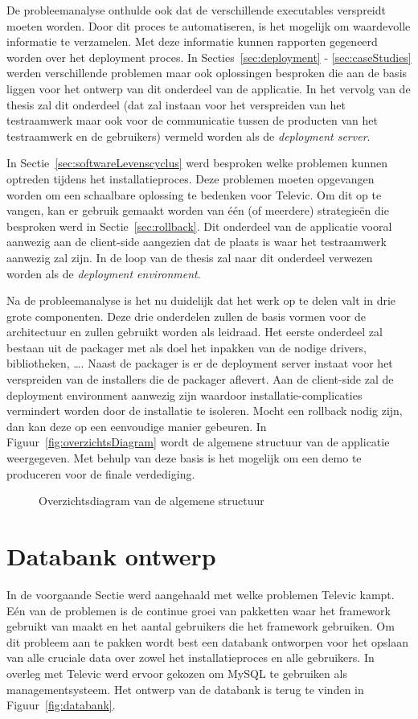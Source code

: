 De probleemanalyse onthulde ook dat de verschillende executables verspreidt moeten worden.
Door dit proces te automatiseren, is het mogelijk om waardevolle informatie te verzamelen.
Met deze informatie kunnen rapporten gegeneerd worden over het deployment proces.
In Secties~\ref{sec:deployment} - \ref{sec:caseStudies} werden verschillende problemen maar ook oplossingen besproken die aan de basis liggen voor het ontwerp van dit onderdeel van de applicatie. 
In het vervolg van de thesis zal dit onderdeel (dat zal instaan voor het verspreiden van het testraamwerk maar ook voor de communicatie tussen de producten van het testraamwerk en de gebruikers) vermeld worden als de \emph{deployment server}.

In Sectie~\vref{sec:softwareLevenscyclus} werd besproken welke problemen kunnen optreden tijdens het installatieproces.
Deze problemen moeten opgevangen worden om een schaalbare oplossing te bedenken voor Televic.
Om dit op te vangen, kan er gebruik gemaakt worden van één (of meerdere) strategieën die besproken werd in Sectie~\vref{sec:rollback}.
Dit onderdeel van de applicatie vooral aanwezig aan de client-side aangezien dat de plaats is waar het testraamwerk aanwezig zal zijn.
In de loop van de thesis zal naar dit onderdeel verwezen worden als de \emph{deployment environment}.

Na de probleemanalyse is het nu duidelijk dat het werk op te delen valt in drie grote componenten.
Deze drie onderdelen zullen de basis vormen voor de architectuur en zullen gebruikt worden als leidraad.
Het eerste onderdeel zal bestaan uit de packager met als doel het inpakken van de nodige drivers, bibliotheken, \ldots .
Naast de packager is er de deployment server instaat voor het verspreiden van de installers die de packager aflevert.
Aan de client-side zal de deployment environment aanwezig zijn waardoor installatie-complicaties vermindert worden door de installatie te isoleren.
Mocht een rollback nodig zijn, dan kan deze op een eenvoudige manier gebeuren.
In Figuur~\vref{fig:overzichtsDiagram} wordt de algemene structuur van de applicatie weergegeven.
Met behulp van deze basis is het mogelijk om een demo te produceren voor de finale verdediging.

\begin{figure}[!hbt]
\centering
  
  \caption{Overzichtsdiagram van de algemene structuur}
  \label{fig:overzichtsDiagram}
\end{figure}

\section{Databank ontwerp}\label{sec:databank}
In de voorgaande Sectie werd aangehaald met welke problemen Televic kampt.
Eén van de problemen is de continue groei van pakketten waar het framework gebruikt van maakt en het aantal gebruikers die het framework gebruiken.
Om dit probleem aan te pakken wordt best een databank ontworpen voor het opslaan van alle cruciale data over zowel het installatieproces en alle gebruikers.
In overleg met Televic werd ervoor gekozen om MySQL te gebruiken als managementsysteem.
Het ontwerp van de databank is terug te vinden in Figuur~\vref{fig:databank}.

